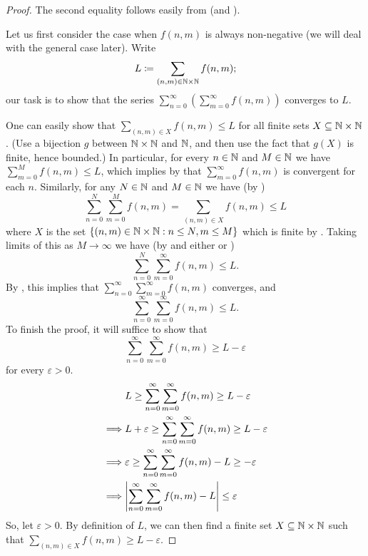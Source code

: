\begin{proof}
  The second equality follows easily from  (and ).

  Let us first consider the case when \(f(n, m)\) is always non-negative (we will deal with the general case later).
  Write
  \[
    L \coloneqq \sum_{(n, m) \in \mathbb{N} \times \mathbb{N}} f(n, m);
  \]
  our task is to show that the series \(\sum_{n = 0}^\infty (\sum_{m = 0}^\infty f(n, m))\) converges to \(L\).

  One can easily show that \(\sum_{(n, m) \in X} f(n, m) \leq L\) for all finite sets \(X \subseteq \mathbb{N} \times \mathbb{N}\).
  (Use a bijection \(g\) between \(\mathbb{N} \times \mathbb{N}\) and \(\mathbb{N}\), and then use the fact that \(g(X)\) is finite, hence bounded.)
  In particular, for every \(n \in \mathbb{N}\) and \(M \in \mathbb{N}\) we have \(\sum_{m = 0}^M f(n, m) \leq L\), which implies by  that \(\sum_{m = 0}^\infty f(n, m)\) is convergent for each \(n\).
  Similarly, for any \(N \in \mathbb{N}\) and \(M \in \mathbb{N}\) we have (by )
  \[
    \sum_{n = 0}^N \sum_{m = 0}^M f(n, m) = \sum_{(n, m) \in X} f(n, m) \leq L
  \]
  where \(X\) is the set \(\left\lbrace(n,m) \in \mathbb{N} \times \mathbb{N} : n \leq N, m \leq M\right\rbrace\) which is finite by .
  Taking limits of this as \(M \to \infty\) we have (by  and either  or )
  \[
    \sum_{n = 0}^N \sum_{m = 0}^\infty f(n, m) \leq L.
  \]
  By , this implies that \(\sum_{n = 0}^\infty \sum_{m = 0}^\infty f(n, m)\) converges, and
  \[
    \sum_{n = 0}^\infty \sum_{m = 0}^\infty f(n, m) \leq L.
  \]
  To finish the proof, it will suffice to show that
  \[
    \sum_{n = 0}^\infty \sum_{m = 0}^\infty f(n, m) \geq L - \varepsilon
  \]
  for every \(\varepsilon > 0\).
  \begin{align*}
             & L \geq \sum_{n = 0}^\infty \sum_{m = 0}^\infty f(n, m) \geq L - \varepsilon               \\
    \implies & L + \varepsilon \geq \sum_{n = 0}^\infty \sum_{m = 0}^\infty f(n, m) \geq L - \varepsilon \\
    \implies & \varepsilon \geq \sum_{n = 0}^\infty \sum_{m = 0}^\infty f(n, m) - L \geq -\varepsilon    \\
    \implies & \abs{\sum_{n = 0}^\infty \sum_{m = 0}^\infty f(n, m) - L} \leq \varepsilon                \\
  \end{align*}
  So, let \(\varepsilon > 0\).
  By definition of \(L\), we can then find a finite set \(X \subseteq \mathbb{N} \times \mathbb{N}\) such that \(\sum_{(n, m) \in X} f(n, m) \geq L - \varepsilon\).

\end{proof}
